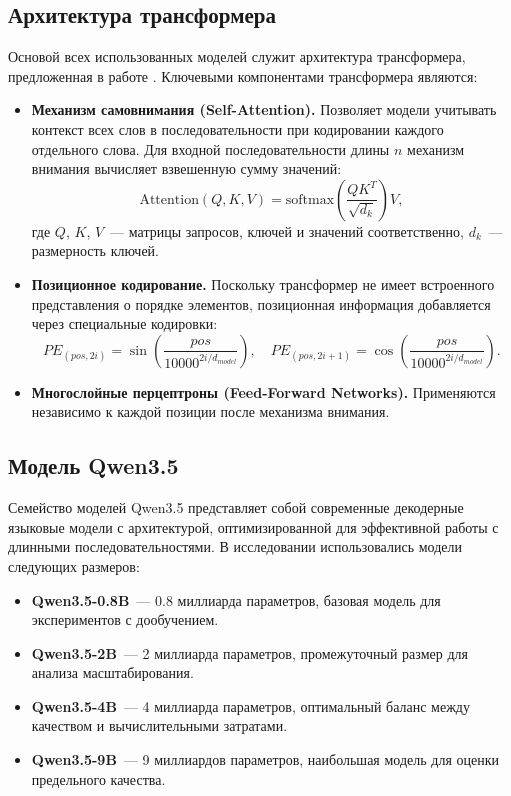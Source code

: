 \documentclass[14pt,a4paper]{extreport}
\begin{document}
\subsection{Архитектура трансформера}

Основой всех использованных моделей служит архитектура трансформера, предложенная в работе \cite{vaswani2017attention}. Ключевыми компонентами трансформера являются:

\begin{itemize}
    \item \textbf{Механизм самовнимания (Self-Attention).} Позволяет модели учитывать контекст всех слов в последовательности при кодировании каждого отдельного слова. Для входной последовательности длины $n$ механизм внимания вычисляет взвешенную сумму значений:
    \begin{equation}
    \mathrm{Attention}(Q, K, V) = \mathrm{softmax}\left(\frac{QK^T}{\sqrt{d_k}}\right)V,
    \end{equation}
    где $Q$, $K$, $V$~--- матрицы запросов, ключей и значений соответственно, $d_k$~--- размерность ключей.
    
    \item \textbf{Позиционное кодирование.} Поскольку трансформер не имеет встроенного представления о порядке элементов, позиционная информация добавляется через специальные кодировки:
    \begin{equation}
    PE_{(pos, 2i)} = \sin\left(\frac{pos}{10000^{2i/d_{model}}}\right), \quad
    PE_{(pos, 2i+1)} = \cos\left(\frac{pos}{10000^{2i/d_{model}}}\right).
    \end{equation}
    
    \item \textbf{Многослойные перцептроны (Feed-Forward Networks).} Применяются независимо к каждой позиции после механизма внимания.
\end{itemize}

\subsection{Модель Qwen3.5}

Семейство моделей Qwen3.5 представляет собой современные декодерные языковые модели с архитектурой, оптимизированной для эффективной работы с длинными последовательностями. В исследовании использовались модели следующих размеров:

\begin{itemize}
    \item \textbf{Qwen3.5-0.8B}~--- 0.8 миллиарда параметров, базовая модель для экспериментов с дообучением.
    \item \textbf{Qwen3.5-2B}~--- 2 миллиарда параметров, промежуточный размер для анализа масштабирования.
    \item \textbf{Qwen3.5-4B}~--- 4 миллиарда параметров, оптимальный баланс между качеством и вычислительными затратами.
    \item \textbf{Qwen3.5-9B}~--- 9 миллиардов параметров, наибольшая модель для оценки предельного качества.
\end{itemize}
\end{document}
